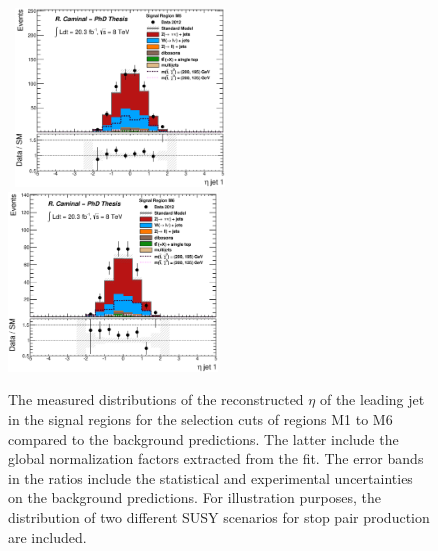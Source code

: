 \begin{figure}[!ht]
\begin{center}
{    }
    \mbox{
      \includegraphics[width=0.495\textwidth]{MonojetAnalysis/Figures/plot_Stop_A9_SR_eta1_fitted.eps}
      \includegraphics[width=0.495\textwidth]{MonojetAnalysis/Figures/plot_Stop_A10_SR_eta1_fitted.eps}
    }
  \end{center}
  \caption[Distributions of the reconstructed $\eta$ of the leading jet in the signal regions for the selection cuts of regions M1 to M6, after the normalization factors extracted from the fit have been applied.]{The measured distributions of the reconstructed $\eta$ of the leading jet in the signal regions for the selection cuts of regions M1 to M6 compared to the background predictions. The latter include the global normalization factors extracted from the fit. The error bands in the ratios include the statistical and experimental uncertainties on the background predictions. For illustration purposes, the distribution of two different SUSY scenarios for stop pair production are included.}
  \label{fig:Plot_M1_SR_eta1}
\end{figure}

